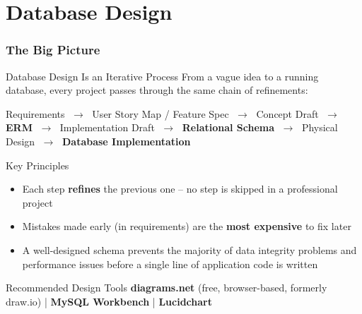 \section{Database Design}

\begin{frame}
  \frametitle{The Big Picture}

  \begin{block}{Database Design Is an Iterative Process}
    From a vague idea to a running database, every project passes through the same chain of refinements:

    \vspace{0.4em}
    \begin{center}
      \small
      Requirements
      $\;\to\;$ User Story Map / Feature Spec
      $\;\to\;$ Concept Draft
      $\;\to\;$ \textbf{ERM}
      $\;\to\;$ Implementation Draft
      $\;\to\;$ \textbf{Relational Schema}
      $\;\to\;$ Physical Design
      $\;\to\;$ \textbf{Database Implementation}
    \end{center}
  \end{block}

  \begin{block}{Key Principles}
    \begin{itemize}
      \item Each step \textbf{refines} the previous one -- no step is skipped in a professional project
      \item Mistakes made early (in requirements) are the \textbf{most expensive} to fix later
      \item A well-designed schema prevents the majority of data integrity problems and performance issues before a single line of application code is written
    \end{itemize}
  \end{block}

  \begin{examples}{Recommended Design Tools}
    \textbf{diagrams.net} (free, browser-based, formerly draw.io) \quad|\quad
    \textbf{MySQL Workbench} \quad|\quad
    \textbf{Lucidchart}
  \end{examples}
\end{frame}

